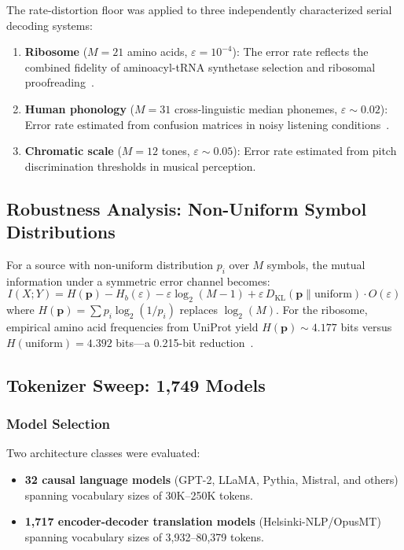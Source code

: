 \documentclass[11pt]{article}
\begin{document}
The rate-distortion floor was applied to three independently characterized serial decoding systems:

\begin{enumerate}
    \item \textbf{Ribosome} ($M = 21$ amino acids, $\varepsilon = 10^{-4}$): The error rate reflects the combined fidelity of aminoacyl-tRNA synthetase selection and ribosomal proofreading~\cite{zaher2009}.
    \item \textbf{Human phonology} ($M = 31$ cross-linguistic median phonemes, $\varepsilon \sim 0.02$): Error rate estimated from confusion matrices in noisy listening conditions~\cite{millernicely1955}.
    \item \textbf{Chromatic scale} ($M = 12$ tones, $\varepsilon \sim 0.05$): Error rate estimated from pitch discrimination thresholds in musical perception.
\end{enumerate}

\subsection{Robustness Analysis: Non-Uniform Symbol Distributions}

For a source with non-uniform distribution $p_i$ over $M$ symbols, the mutual information under a symmetric error channel becomes:
\begin{equation}
    I(X;Y) = H(\mathbf{p}) - H_b(\varepsilon) - \varepsilon \log_2(M - 1) + \varepsilon \, D_{\mathrm{KL}}(\mathbf{p} \| \mathrm{uniform}) \cdot O(\varepsilon)
\end{equation}
where $H(\mathbf{p}) = \sum p_i \log_2(1/p_i)$ replaces $\log_2(M)$. For the ribosome, empirical amino acid frequencies from UniProt yield $H(\mathbf{p}) \sim 4.177$ bits versus $H(\mathrm{uniform}) = 4.392$ bits---a 0.215-bit reduction~\cite{zaher2009}.

\subsection{Tokenizer Sweep: 1,749 Models}

\subsubsection{Model Selection}

Two architecture classes were evaluated:
\begin{itemize}
    \item \textbf{32 causal language models} (GPT-2, LLaMA, Pythia, Mistral, and others) spanning vocabulary sizes of 30K--250K tokens.
    \item \textbf{1,717 encoder-decoder translation models} (Helsinki-NLP/OpusMT) spanning vocabulary sizes of 3,932--80,379 tokens.
\end{itemize}
\end{document}
